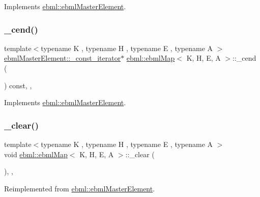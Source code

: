 Implements \mbox{\hyperlink{classebml_1_1ebmlMasterElement_a7e1ffa498e22b637a6671df14aa0bc45}{ebml\+::ebml\+Master\+Element}}.

\mbox{\label{classebml_1_1ebmlMap_a2a667c679c5ba26d47d834a42921f988}} 
\subsubsection{\texorpdfstring{\+\_\+cend()}{\_cend()}}
{\footnotesize\ttfamily template$<$typename K , typename H , typename E , typename A $>$ \\
\mbox{\hyperlink{classebml_1_1ebmlMasterElement_1_1__const__iterator}{ebml\+Master\+Element\+::\+\_\+const\+\_\+iterator}}$\ast$ \mbox{\hyperlink{classebml_1_1ebmlMap}{ebml\+::ebml\+Map}}$<$ K, H, E, A $>$\+::\+\_\+cend (\begin{DoxyParamCaption}{ }\end{DoxyParamCaption}) const\hspace{0.3cm}{\ttfamily [override]}, {\ttfamily [protected]}, {\ttfamily [virtual]}}



Implements \mbox{\hyperlink{classebml_1_1ebmlMasterElement_ae6cdbf68d8267a7ab098bd402fa70e88}{ebml\+::ebml\+Master\+Element}}.

\mbox{\label{classebml_1_1ebmlMap_a3aaf6a51c0e03d5050bdefc527f9776c}} 
\subsubsection{\texorpdfstring{\+\_\+clear()}{\_clear()}}
{\footnotesize\ttfamily template$<$typename K , typename H , typename E , typename A $>$ \\
void \mbox{\hyperlink{classebml_1_1ebmlMap}{ebml\+::ebml\+Map}}$<$ K, H, E, A $>$\+::\+\_\+clear (\begin{DoxyParamCaption}{ }\end{DoxyParamCaption})\hspace{0.3cm}{\ttfamily [override]}, {\ttfamily [protected]}, {\ttfamily [virtual]}}



Reimplemented from \mbox{\hyperlink{classebml_1_1ebmlMasterElement_a2fdf9fa1022f06a046fe94e631e266a3}{ebml\+::ebml\+Master\+Element}}.

